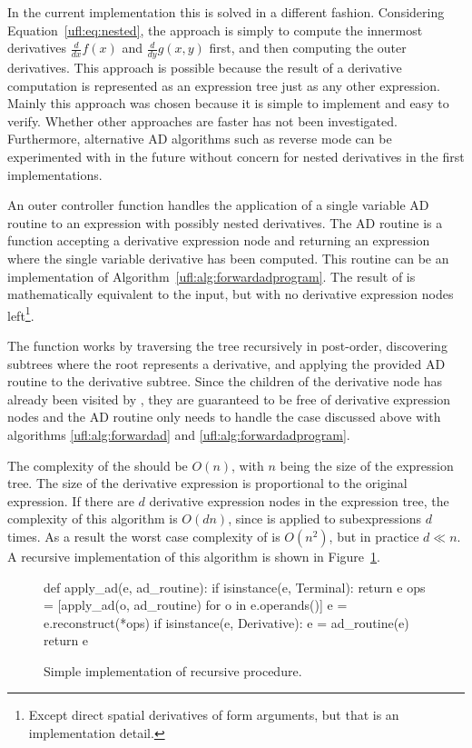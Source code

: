 In the current \ufl{} implementation this is solved in a different
fashion.  Considering Equation~\eqref{ufl:eq:nested}, the approach is
simply to compute the innermost derivatives $\frac{d}{dx} f(x)$ and
$\frac{d}{dy} g(x,y)$ first, and then computing the outer derivatives.
This approach is possible because the result of a derivative computation
is represented as an expression tree just as any other expression.
Mainly this approach was chosen because it is simple to implement
and easy to verify.  Whether other approaches are faster has not been
investigated.  Furthermore, alternative AD algorithms such as reverse
mode can be experimented with in the future without concern for nested
derivatives in the first implementations.

An outer controller function  handles the application
of a single variable AD routine to an expression with possibly nested
derivatives.  The AD routine is a function accepting a derivative
expression node and returning an expression where the single variable
derivative has been computed.  This routine can be an implementation of
Algorithm~\ref{ufl:alg:forwardadprogram}.  The result of 
is mathematically equivalent to the input, but with no derivative
expression nodes left\footnote{Except direct spatial
  derivatives of form arguments, but that is an implementation detail.}.

The function  works by traversing the tree recursively
in post-order, discovering subtrees where the root represents a
derivative, and applying the provided AD routine to the derivative
subtree.  Since the children of the derivative node has already
been visited by , they are guaranteed to be free of
derivative expression nodes and the AD routine only needs to handle
the case discussed above with algorithms \ref{ufl:alg:forwardad} and
\ref{ufl:alg:forwardadprogram}.

The complexity of the  should be $O(n)$, with $n$
being the size of the expression tree.  The size of the derivative
expression is proportional to the original expression.  If there are
$d$ derivative expression nodes in the expression tree, the complexity
of this algorithm is $O(d n)$, since  is applied to
subexpressions $d$ times.  As a result the worst case complexity of
 is $O(n^2)$, but in practice $d \ll n$.  A recursive
implementation of this algorithm is shown in Figure~\ref{ufl:fig:applyad}.

\begin{figure}
\begin{python}
def apply_ad(e, ad_routine):
    if isinstance(e, Terminal):
        return e
    ops = [apply_ad(o, ad_routine) for o in e.operands()]
    e = e.reconstruct(*ops)
    if isinstance(e, Derivative):
        e = ad_routine(e)
    return e
\end{python}
\caption{Simple implementation of recursive  procedure.}
\label{ufl:fig:applyad}
\end{figure}

